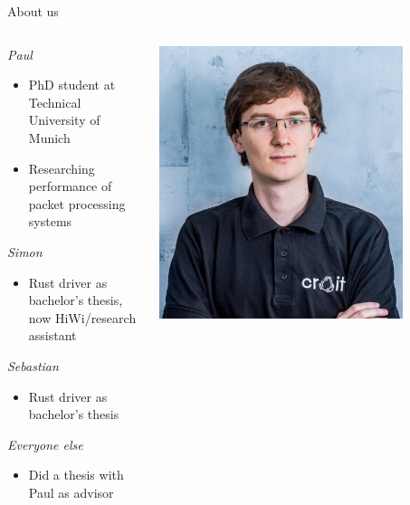 \documentclass[NET,english,aspectratio=169,notitleframe]{tumbeamer}
\begin{document}
\begin{frame}{About us}
\begin{columns}
\begin{column}{0.8\textwidth}
\emph{Paul}
\begin{itemize}
\item PhD student at Technical University of Munich
\item Researching performance of packet processing systems
\end{itemize}
\vfill
\emph{Simon}
\begin{itemize}
\item Rust driver as bachelor's thesis, now HiWi/research assistant
\end{itemize}
\emph{Sebastian}
\begin{itemize}
\item Rust driver as bachelor's thesis
\end{itemize}
\emph{Everyone else}
\begin{itemize}
\item Did a thesis with Paul as advisor
\end{itemize}
\end{column}
\begin{column}{0.15\textwidth}
\includegraphics[width=0.8\textwidth]{pics/paul.jpg}\\

\end{column}
\end{columns}
\end{frame}
\end{document}
